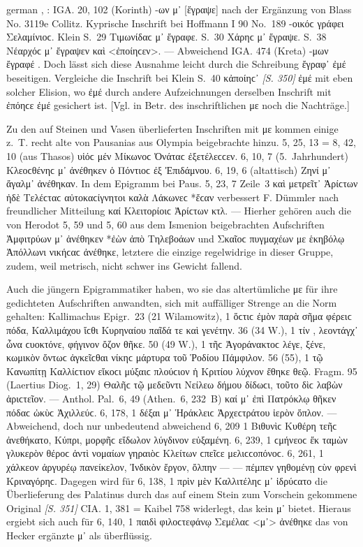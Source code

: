 \begin{otherlanguage*}{german}
, : IGA. 20, 102 (Korinth) -ων μ᾽ [ἔγραψε] nach der Ergänzung von Blass No. 3119e Collitz. Kyprische Inschrift bei Hoffmann I 90 No.~189 -οικόϲ  γράφει Σελαμίνιοϲ. Klein S.~29 Τιμωνίδαϲ μ᾽ ἔγραφε. S.~30 Χάρηϲ μ᾽ ἔγραψε. S.~38 Νέαρχόϲ μ᾽ ἔγραψεν καὶ <ἐποίηϲεν>. — Abweichend IGA. 474 (Kreta) -μων ἔγραφέ . Doch lässt sich diese Ausnahme leicht durch die Schreibung ἔγραφ᾽ ἐμέ beseitigen. Vergleiche die Inschrift bei Klein S.~40 κἀποίηϲ᾽ \hypertarget{p350}{\emph{[S. 350]}}\label{p350} ἐμέ mit eben solcher Elision, wo ἐμέ durch andere Aufzeichnungen derselben Inschrift mit ἐπόηϲε ἐμέ gesichert ist. [Vgl. in Betr. des inschriftlichen με noch die Nachträge.]

Zu den auf Steinen und Vasen überlieferten Inschriften mit με kommen einige z.~T. recht alte von Pausanias aus Olympia beigebrachte hinzu. 5, 25, 13 = 8, 42, 10 (aus Thasos) υἱόϲ μέν  Μίκωνοϲ Ὀνάταϲ ἐξετέλεϲϲεν. 6, 10, 7 (5.~Jahrhundert) Κλεοϲθένηϲ μ᾽ ἀνέθηκεν ὁ Πόντιοϲ ἐξ Ἐπιδάμνου. 6, 19, 6 (altattisch) Ζηνί μ᾽ ἄγαλμ᾽ ἀνέθηκαν. In dem Epigramm bei Paus. 5, 23, 7 Zeile~3 καὶ μετρεῖτ᾽ Ἀρίϲτων ἠδὲ Τελέϲταϲ αὐτοκαϲίγνητοι καλὰ Λάκωνεϲ *ἔϲαν verbessert F. Dümmler nach freundlicher Mitteilung καί  Κλειτορίοιϲ Ἀρίϲτων κτλ. — Hierher gehören auch die von Herodot 5, 59 und 5, 60 aus dem Ismenion beigebrachten Aufschriften Ἀμφιτρύων μ᾽ ἀνέθηκεν *ἐὼν ἀπὸ Τηλεβοάων und Σκαῖοϲ πυγμαχέων με ἑκηβόλῳ Ἀπόλλωνι νικήϲαϲ ἀνέθηκε, letztere die einzige regelwidrige in dieser Gruppe, zudem, weil metrisch, nicht schwer ins Gewicht fallend.

Auch die jüngern Epigrammatiker haben, wo sie das altertümliche με für ihre gedichteten Aufschriften anwandten, sich mit auffälliger Strenge an die Norm gehalten: Kallimachus Epigr.~23 (21 Wilamowitz), 1 ὅϲτιϲ ἐμὸν παρὰ σῆμα φέρειϲ πόδα, Καλλιμάχου  ἴϲθι Κυρηναίου παῖδά τε καὶ γενέτην. 36 (34 W.), 1 τίν , λεοντάγχ᾽ ὦνα ϲυοκτόνε, φήγινον ὄζον θῆκε. 50 (49 W.), 1 τῆϲ Ἀγοράνακτοϲ  λέγε, ξένε, κωμικὸν ὄντωϲ ἀγκεῖϲθαι νίκηϲ μάρτυρα τοῦ Ῥοδίου Πάμφιλον. 56 (55), 1 τῷ  Κανωπίτῃ Καλλίϲτιον εἴκοϲι μύξαιϲ πλούϲιον ἡ Κριτίου λύχνον ἔθηκε θεῷ. Fragm. 95 (Laertius Diog.~1, 29) Θαλῆϲ  τῷ μεδεῦντι Νείλεω δήμου δίδωϲι, τοῦτο δὶϲ λαβὼν ἀριϲτεῖον. — Anthol. Pal.~6, 49 (Athen.~6, 232~Β) καί μ᾽ ἐπὶ Πατρόκλῳ θῆκεν πόδαϲ ὠκὺϲ Ἀχιλλεύϲ. 6, 178, 1 δέξαι μ᾽ Ἡράκλειϲ Ἀρχεϲτράτου ἱερὸν ὅπλον. — Abweichend, doch nur unbedeutend abweichend 6, 209 1 Βιθυνὶϲ Κυθέρη  τεῆϲ ἀνεθήκατο, Κύπρι, μορφῆϲ εἴδωλον λύγδινον εὐξαμένη. 6, 239, 1 ϲμήνεοϲ ἔκ  ταμὼν γλυκερὸν θέροϲ ἀντὶ νομαίων γηραιὸϲ Κλείτων ϲπεῖϲε μελιϲϲοπόνοϲ. 6, 261, 1 χάλκεον ἀργυρέῳ  πανείκελον, Ἰνδικὸν ἔργον, ὄλπην — — πέμπεν γηθομένῃ ϲὺν φρενὶ Κριναγόρηϲ. Dagegen wird für 6, 138, 1 πρὶν μὲν Καλλιτέληϲ μ᾽ ἱδρύϲατο die Überlieferung des Palatinus durch das auf einem Stein zum Vorschein gekommene Original \hypertarget{p351}{\emph{[S. 351]}}\label{p351} CIA. 1, 381 = Kaibel 758 widerlegt, das kein μ᾽ bietet. Hieraus ergiebt sich auch für 6, 140, 1 παιδὶ φιλοϲτεφάνῳ Σεμέλαϲ <μ᾽> ἀνέθηκε das von Hecker ergänzte μ᾽ als überflüssig.


\end{otherlanguage*}
